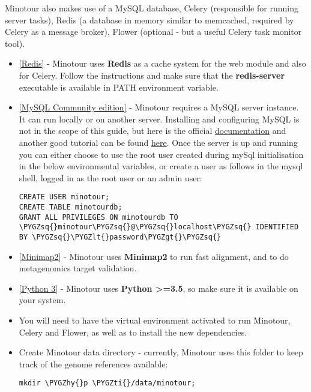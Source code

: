 \documentclass[letterpaper,10pt,english]{sphinxmanual}
\def\PYGZlt{\char`\<}
\def\PYGZgt{\char`\>}
\def\PYGZhy{\char`\-}
\def\PYGZsq{\char`\'}
\def\PYGZti{\char`\~}
\renewcommand\PYGZsq{\textquotesingle}
\begin{document}
Minotour also makes use of a MySQL database, Celery (responsible for running server tasks), Redis (a database in memory similar to memcached, required by Celery as a message broker), Flower (optional - but a useful Celery task monitor tool).
\begin{itemize}
\item {} 
\href{https://redis.io/download}{{[}Redis{]}} - Minotour uses \textbf{Redis} as a cache system for the web module and also for Celery. Follow the instructions and make sure that the \textbf{redis-server} executable is available in PATH environment variable.

\item {} 
\href{https://dev.mysql.com/downloads/}{{[}MySQL Community edition{]}} - Minotour requires a MySQL server instance. It can run locally or on another server. Installing and configuring MySQL is not in the scope of this guide, but here is the official \href{https://dev.mysql.com/doc/mysql-getting-started/en/}{documentation} and another good tutorial can be found \href{https://www.digitalocean.com/community/tutorials/how-to-install-mysql-on-ubuntu-16-04}{here}. Once the server is up and running you can either choose to use the root user created during mySql initialisation in the below environmental variables, or create a user as follows in the mysql shell, logged in as the root user or an admin user:

\begin{Verbatim}[commandchars=\\\{\}]
CREATE USER minotour;
CREATE TABLE minotourdb;
GRANT ALL PRIVILEGES ON minotourdb TO \PYGZsq{}minotour\PYGZsq{}@\PYGZsq{}localhost\PYGZsq{} IDENTIFIED BY \PYGZsq{}\PYGZlt{}password\PYGZgt{}\PYGZsq{}
\end{Verbatim}

\item {} 
\href{https://github.com/lh3/minimap2}{{[}Minimap2{]}} - Minotour uses \textbf{Minimap2} to run fast alignment, and to do metagenomics target validation.

\item {} 
\href{https://www.python.org}{{[}Python 3{]}} - Minotour uses \textbf{Python \textgreater{}=3.5}, so make sure it is available on your system.

\item {} 
You will need to have the virtual environment activated to run Minotour, Celery and Flower, as well as to install the new dependencies.

\item {} 
Create Minotour data directory - currently, Minotour uses this folder to keep track of the genome references available:

\begin{Verbatim}[commandchars=\\\{\}]
mkdir \PYGZhy{}p \PYGZti{}/data/minotour;
\end{Verbatim}

\end{itemize}
\end{document}
